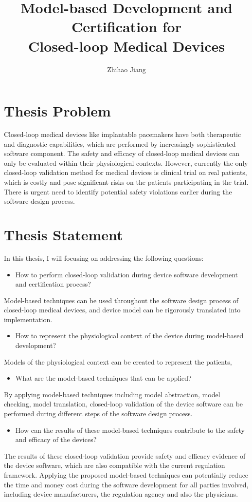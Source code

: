 \documentclass[a4paper]{article}
\title{Model-based Development and Certification for\\ Closed-loop Medical Devices}
\author{Zhihao Jiang}
\begin{document}
\maketitle


\section*{Thesis Problem}
Closed-loop medical devices like implantable pacemakers have both therapeutic and diagnostic capabilities, which are performed by increasingly sophisticated software component. 
The safety and efficacy of closed-loop medical devices can only be evaluated within their physiological contexts. 
However, currently the only closed-loop validation method for medical devices is clinical trial on real patients, which is costly and pose significant risks on the patients participating in the trial. 
There is urgent need to identify potential safety violations earlier during the software design process.

\section*{Thesis Statement}
In this thesis, I will focusing on addressing the following questions:
\begin{itemize}
\item How to perform closed-loop validation during device software development and certification process?
\end{itemize}
Model-based techniques can be used throughout the software design process of closed-loop medical devices, and device model can be rigorously translated into implementation. 
\begin{itemize}
\item How to represent the physiological context of the device during model-based development?
\end{itemize}
Models of the physiological context can be created to represent the patients,
\begin{itemize}
\item What are the model-based techniques that can be applied?
\end{itemize}
By applying model-based techniques including model abstraction, model checking, model translation, closed-loop validation of the device software can be performed during different steps of the software design process.
\begin{itemize}
\item How can the results of these model-based techniques contribute to the safety and efficacy of the devices?
\end{itemize}
The results of these closed-loop validation provide safety and efficacy evidence of the device software, which are also compatible with the current regulation framework. 
Applying the proposed model-based techniques can potentially reduce the time and money cost during the software development for all parties involved, including device manufacturers, the regulation agency and also the physicians.
\end{document}
